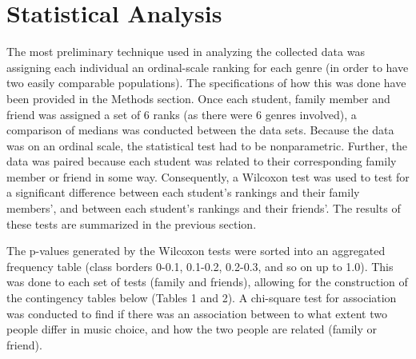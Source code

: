 \documentclass[12pt]{report}
\begin{document}
\chapter*{Statistical Analysis}
The most preliminary technique used in analyzing the collected data was assigning each individual an ordinal-scale ranking for each genre (in order to have two easily comparable populations). The specifications of how this was done have been provided in the Methods section. Once each student, family member and friend was assigned a set of 6 ranks (as there were 6 genres involved), a comparison of medians was conducted between the data sets. Because the data was on an ordinal scale, the statistical test had to be nonparametric. Further, the data was paired because each student was related to their corresponding family member or friend in some way. Consequently, a Wilcoxon test was used to test for a significant difference between each student's rankings and their family members', and between each student's rankings and their friends'. The results of these tests are summarized in the previous section.

The p-values generated by the Wilcoxon tests were sorted into an aggregated frequency table (class borders 0-0.1, 0.1-0.2, 0.2-0.3, and so on up to 1.0). This was done to each set of tests (family and friends), allowing for the construction of the contingency tables below (Tables 1 and 2). A chi-square test for association was conducted to find if there was an association between to what extent two people differ in music choice, and how the two people are related (family or friend).
\end{document}
